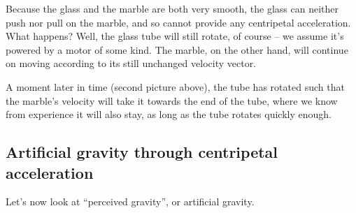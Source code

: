 \begin{figure}[H]
\begin{subfigure}[b]{0.4\textwidth}
\end{subfigure}
\end{figure}

Because the glass and the marble are both very smooth, the glass can neither push nor pull on the marble, and so cannot provide any centripetal acceleration. What happens? Well, the glass tube will still rotate, of course -- we assume it's powered by a motor of some kind. The marble, on the other hand, will continue on moving according to its still unchanged velocity vector.

A moment later in time (second picture above), the tube has rotated such that the marble's velocity will take it towards the end of the tube, where we know from experience it will also stay, as long as the tube rotates quickly enough.

\subsection{Artificial gravity through centripetal acceleration}

Let's now look at ``perceived gravity'', or artificial gravity.

